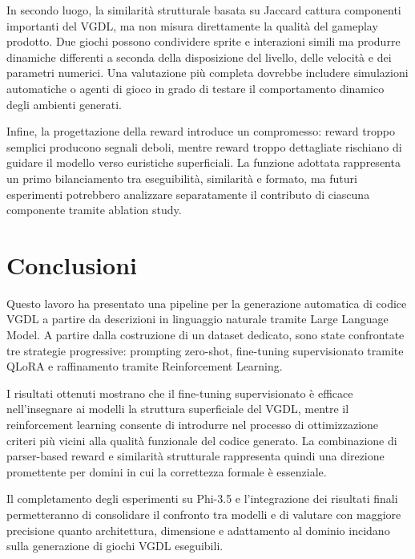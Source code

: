 \documentclass[final,5p,times,twocolumn]{elsarticle}
\begin{document}
In secondo luogo, la similarit\`a strutturale basata su Jaccard cattura componenti importanti del VGDL, ma non misura direttamente la qualit\`a del gameplay prodotto. Due giochi possono condividere sprite e interazioni simili ma produrre dinamiche differenti a seconda della disposizione del livello, delle velocit\`a e dei parametri numerici. Una valutazione pi\`u completa dovrebbe includere simulazioni automatiche o agenti di gioco in grado di testare il comportamento dinamico degli ambienti generati.

Infine, la progettazione della reward introduce un compromesso: reward troppo semplici producono segnali deboli, mentre reward troppo dettagliate rischiano di guidare il modello verso euristiche superficiali. La funzione adottata rappresenta un primo bilanciamento tra eseguibilit\`a, similarit\`a e formato, ma futuri esperimenti potrebbero analizzare separatamente il contributo di ciascuna componente tramite ablation study.

\section{Conclusioni}

Questo lavoro ha presentato una pipeline per la generazione automatica di codice VGDL a partire da descrizioni in linguaggio naturale tramite Large Language Model. A partire dalla costruzione di un dataset dedicato, sono state confrontate tre strategie progressive: prompting zero-shot, fine-tuning supervisionato tramite QLoRA e raffinamento tramite Reinforcement Learning.

I risultati ottenuti mostrano che il fine-tuning supervisionato \`e efficace nell'insegnare ai modelli la struttura superficiale del VGDL, mentre il reinforcement learning consente di introdurre nel processo di ottimizzazione criteri pi\`u vicini alla qualit\`a funzionale del codice generato. La combinazione di parser-based reward e similarit\`a strutturale rappresenta quindi una direzione promettente per domini in cui la correttezza formale \`e essenziale.

Il completamento degli esperimenti su Phi-3.5 e l'integrazione dei risultati finali permetteranno di consolidare il confronto tra modelli e di valutare con maggiore precisione quanto architettura, dimensione e adattamento al dominio incidano sulla generazione di giochi VGDL eseguibili.

\newpage


\end{document}

